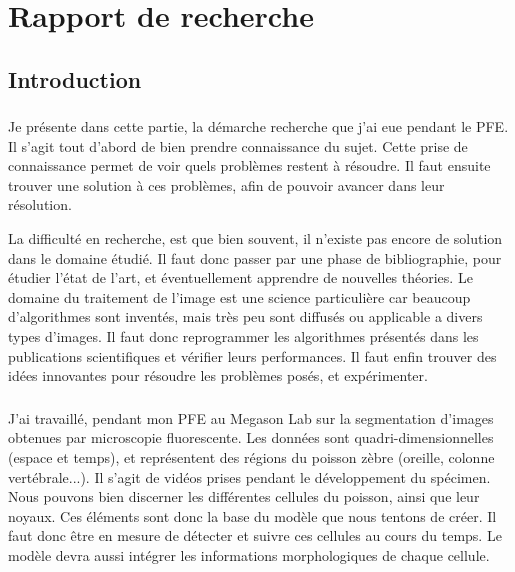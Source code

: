 

\chapter{Rapport de recherche} 

\section*{Introduction}

\subsection*{}
Je présente dans cette partie, la démarche recherche que j'ai eue pendant le PFE. Il s'agit tout d'abord de bien prendre connaissance du sujet. Cette prise de connaissance permet de voir quels problèmes restent à résoudre. Il faut ensuite trouver une solution à ces problèmes, afin de pouvoir avancer dans leur résolution.

La difficulté en recherche, est que bien souvent, il n'existe pas encore de solution dans le domaine étudié.
Il faut donc passer par une phase de bibliographie, pour étudier l'état de l'art,
et éventuellement apprendre de nouvelles théories.
Le domaine du traitement de l'image est une science particulière car beaucoup d'algorithmes sont inventés,
mais très peu sont diffusés ou applicable a divers types d'images.
Il faut donc reprogrammer les algorithmes présentés dans les publications scientifiques et vérifier leurs performances.
Il faut enfin trouver des idées innovantes pour résoudre les problèmes posés, et expérimenter.

\subsection*{}
J'ai travaillé, pendant mon PFE au Megason Lab sur la segmentation d'images obtenues par microscopie fluorescente.
Les données sont quadri-dimensionnelles (espace et temps), et représentent des régions du poisson zèbre (oreille, colonne vertébrale...). Il s'agit de vidéos prises pendant le développement du spécimen. Nous pouvons bien discerner les différentes cellules du poisson, ainsi que leur noyaux. Ces éléments sont donc la base du modèle que nous tentons de créer. Il faut donc être en mesure de détecter et suivre ces cellules au cours du temps. Le modèle devra aussi intégrer les informations morphologiques de chaque cellule.

